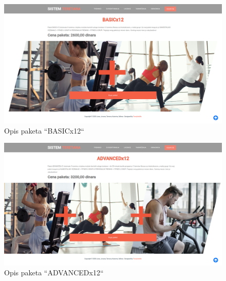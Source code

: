 \documentclass[../main.tex]{subfiles}
\begin{document}
\begin{figure}[!ht]
\begin{center}
\includegraphics[scale=0.22]{sections/korisnicki_interfejs/screenshots/paket_basicx12_opis_i_kupovina_paketa.png}
\end{center}
\caption{Opis paketa ``BASICx12``}
\label{fig:paket_b_12}
\end{figure}

\begin{figure}[!ht]
\begin{center}
\includegraphics[scale=0.22]{sections/korisnicki_interfejs/screenshots/paket_advancedx12_opis_i_kupovina_paketa.png}
\end{center}
\caption{Opis paketa ``ADVANCEDx12``}
\label{fig:paket_a_12}
\end{figure}
\end{document}
